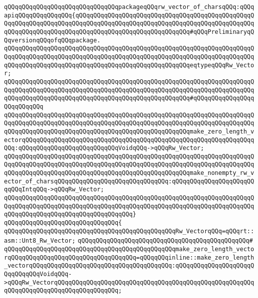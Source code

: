 \verb|qQQqqQQqqQQqqQQqqQQqqQQqqQQqqQQqpackageqQQqrw_vector_of_charsqQQq:qQQqapiqQQqqQQqqQQqqQQq{qQQqqQQqqQQqqQQqqQQqqQQqqQQqqQQqqQQqqQQqqQQqqQQqqQQqqQQqqQQqqQQqqQQqqQQqqQQqqQQqqQQqqQQqqQQqqQQqqQQqqQQqqQQqqQQqqQQqqQQqqQQqqQQqqQQqqQQqqQQqqQQqqQQqqQQqqQQqqQQqqQQqqQQqqQQq#qQQqPreliminaryqQQqversionqQQqofqQQqpackage.|\newline
\verb|qQQqqQQqqQQqqQQqqQQqqQQqqQQqqQQqqQQqqQQqqQQqqQQqqQQqqQQqqQQqqQQqqQQqqQQqqQQqqQQqqQQqqQQqqQQqqQQqqQQqqQQqqQQqqQQqqQQqqQQqqQQqqQQqqQQqqQQqqQQqqQQqqQQqqQQqqQQqqQQqqQQqqQQqqQQqqQQqqQQqqQQqqQQqqQQqeqtypeqQQqRw_Vector;|\newline
\verb|qQQqqQQqqQQqqQQqqQQqqQQqqQQqqQQqqQQqqQQqqQQqqQQqqQQqqQQqqQQqqQQqqQQqqQQqqQQqqQQqqQQqqQQqqQQqqQQqqQQqqQQqqQQqqQQqqQQqqQQqqQQqqQQqqQQqqQQqqQQqqQQqqQQqqQQqqQQqqQQqqQQqqQQqqQQqqQQqqQQqqQQqqQQqqQQq#qQQqqQQqqQQqqQQqqQQqqQQqqQQq|\newline
\verb|qQQqqQQqqQQqqQQqqQQqqQQqqQQqqQQqqQQqqQQqqQQqqQQqqQQqqQQqqQQqqQQqqQQqqQQqqQQqqQQqqQQqqQQqqQQqqQQqqQQqqQQqqQQqqQQqqQQqqQQqqQQqqQQqqQQqqQQqqQQqqQQqqQQqqQQqqQQqqQQqqQQqqQQqqQQqqQQqqQQqqQQqqQQqqQQqmake_zero_length_vectorqQQqqQQqqQQqqQQqqQQqqQQqqQQqqQQqqQQqqQQqqQQqqQQqqQQqqQQqqQQqqQQqqQQq:qQQqqQQqqQQqqQQqqQQqqQQqqQQqVoidqQQq->qQQqRw_Vector;|\newline
\verb|qQQqqQQqqQQqqQQqqQQqqQQqqQQqqQQqqQQqqQQqqQQqqQQqqQQqqQQqqQQqqQQqqQQqqQQqqQQqqQQqqQQqqQQqqQQqqQQqqQQqqQQqqQQqqQQqqQQqqQQqqQQqqQQqqQQqqQQqqQQqqQQqqQQqqQQqqQQqqQQqqQQqqQQqqQQqqQQqqQQqqQQqqQQqqQQqmake_nonempty_rw_vector_of_charsqQQqqQQqqQQqqQQqqQQqqQQqqQQqqQQq:qQQqqQQqqQQqqQQqqQQqqQQqqQQqIntqQQq->qQQqRw_Vector;|\newline
\verb|qQQqqQQqqQQqqQQqqQQqqQQqqQQqqQQqqQQqqQQqqQQqqQQqqQQqqQQqqQQqqQQqqQQqqQQqqQQqqQQqqQQqqQQqqQQqqQQqqQQqqQQqqQQqqQQqqQQqqQQqqQQqqQQqqQQqqQQqqQQqqQQqqQQqqQQqqQQqqQQqqQQqqQQqqQQqqQQq}|\newline
\verb|qQQqqQQqqQQqqQQqqQQqqQQqqQQqqQQq{|\newline
\verb|qQQqqQQqqQQqqQQqqQQqqQQqqQQqqQQqqQQqqQQqqQQqqQQqRw_VectorqQQq=qQQqrt::asm::Unt8_Rw_Vector;|\newline
\verb|qQQqqQQqqQQqqQQqqQQqqQQqqQQqqQQqqQQqqQQqqQQqqQQq#|\newline
\verb|qQQqqQQqqQQqqQQqqQQqqQQqqQQqqQQqqQQqqQQqqQQqqQQqmake_zero_length_vectorqQQqqQQqqQQqqQQqqQQqqQQqqQQqqQQqqQQq=qQQqqQQqinline::make_zero_length_vectorqQQqqQQqqQQqqQQqqQQqqQQqqQQqqQQqqQQqqQQq:qQQqqQQqqQQqqQQqqQQqqQQqqQQqqQQqVoidqQQq->qQQqRw_VectorqQQqqQQqqQQqqQQqqQQqqQQqqQQqqQQqqQQqqQQqqQQqqQQqqQQqqQQqqQQqqQQqqQQqqQQqqQQqqQQqqQQqqQQq;|\newline
